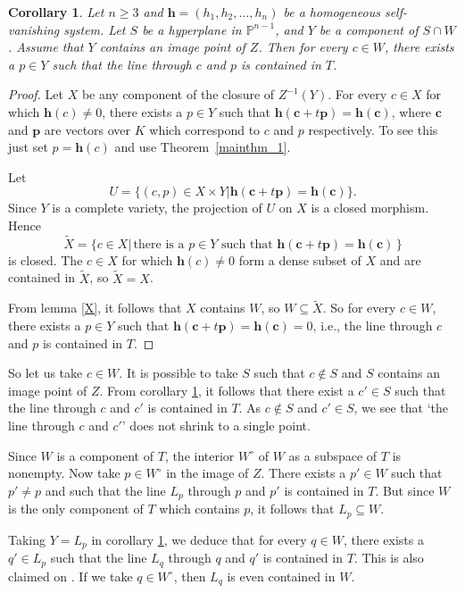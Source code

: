 \documentclass[12pt]{article}
\newtheorem{corollary}[theorem]{Corollary}
\theoremstyle{definition}
\theoremstyle{remark}
\newcommand {\PP}{\mathbb{P}}
\begin{document}
\begin{corollary} \label{Y}
Let $n \ge 3$ and $\bm{h} = (h_1, h_2, \ldots,h_n)$ be a homogeneous self-vanishing system.
Let $S$ be a hyperplane in $\PP^{n-1}$, and $Y$ be a component of $S \cap W$.
Assume that $Y$ contains an image point of $Z$. 
Then for every $c \in W$, there exists a $p \in Y$ such that the line
through $c$ and $p$ is contained in $T$.
\end{corollary}

\begin{proof}
  Let $X$ be any component of the closure of $Z^{-1}(Y)$.
  For every $c \in X$
for which $\bm{h}(c) \ne 0$, there exists a $p \in Y$ such that 
$\bm{h}(\bm{c}+t\bm{p}) = \bm{h}(\bm{c})$, where $\bm{c}$ and $\bm{p}$ are
vectors over $K$ which correspond to $c$ and $p$ respectively. 
To see this just set $p = \bm{h}(c)$ and use Theorem~\ref{mainthm_1}. 

Let
$$
U = \{ (c,p) \in X \times Y | \bm{h}(\bm{c}+t\bm{p}) = \bm{h}(\bm{c}) \}. 
$$
Since $Y$ is a complete variety, the projection of $U$ on $X$ is a closed
morphism. Hence
$$
\tilde{X} = \{ c \in X |\,\mbox{there is a $p \in Y$ such that 
$\bm{h}(\bm{c}+t\bm{p}) = \bm{h}(\bm{c})$}\,\}
$$ is closed. The $c \in X$
for which $\bm{h}(c) \ne 0$ form a dense subset of $X$ and are contained in 
$\tilde{X}$, so $\tilde{X} = X$. 

From lemma \ref{X}, it follows that $X$ contains $W$, so 
$W \subseteq \tilde{X}$. So for every $c \in W$, there exists a 
$p \in Y$ such that 
$\bm{h}(\bm{c}+t\bm{p}) = \bm{h}(\bm{c}) = 0$, i.e.,
the line through $c$ and $p$ is contained in $T$.
\end{proof}

So let us take $c \in W$. It is possible to take  $S$ such that $c \notin S$ and $S$ contains an image point of $Z$.
From corollary \ref{Y}, it follows that there exist a $c' \in S$ such that  
the line through $c$ and $c'$ is contained in $T$. As $c \notin S$ and $c' \in S$, 
we see that `the line through $c$ and $c'$' does not shrink to a single point.

Since $W$ is a component of $T$, the interior $W^{\circ}$ of $W$
as a subspace of $T$ is nonempty. Now take $p \in W^{\circ}$ in the image of $Z$.
There exists a $p' \in W$ such that $p' \ne p$ and such that the line $L_p$ through $p$
and $p'$ is contained in $T$. But since $W$ is the only component of $T$ which contains
$p$, it follows that $L_p \subseteq W$. 

Taking $Y = L_p$ in corollary \ref{Y}, we deduce that for every $q \in W$,
there exists a $q' \in L_p$ such that the line $L_q$ through $q$ and $q'$ 
is contained in $T$. This is also claimed on \cite[p.\@ 565]{GNzzz}. If we take
$q \in W^{\circ}$, then $L_q$ is even contained in $W$.
\end{document}

